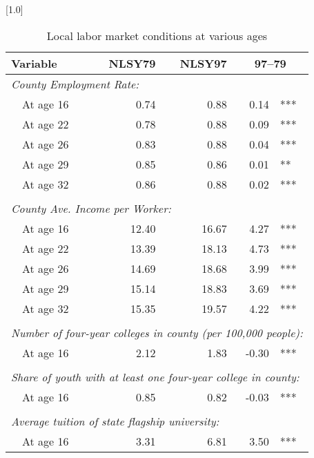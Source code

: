 \begin{table}[ht]
\caption{Local labor market conditions at various ages}
\label{tab:locallabmktbyage}
\centering
\scalebox{1.0}[1.0]{%
\begin{threeparttable}
\begin{tabular}{lrrr@{}l}
\toprule 
Variable \phantom{extraspacehere} & NLSY79 & NLSY97 & \multicolumn{2}{c}{97--79} \\
\midrule 
\multicolumn{5}{l}{\emph{County Employment Rate:}} \\
~~At age 16                      & 0.74 & 0.88 & 0.14 & *** \\ 
~~At age 22                      & 0.78 & 0.88 & 0.09 & *** \\ 
~~At age 26                      & 0.83 & 0.88 & 0.04 & *** \\ 
~~At age 29                      & 0.85 & 0.86 & 0.01 & ** \\ 
~~At age 32                      & 0.86 & 0.88 & 0.02 & *** \\ 
\vspace{-6pt}  \\
\multicolumn{5}{l}{\emph{County Ave. Income per Worker:}} \\
~~At age 16                      & 12.40 & 16.67 & 4.27 & *** \\ 
~~At age 22                      & 13.39 & 18.13 & 4.73 & *** \\ 
~~At age 26                      & 14.69 & 18.68 & 3.99 & *** \\ 
~~At age 29                      & 15.14 & 18.83 & 3.69 & *** \\ 
~~At age 32                      & 15.35 & 19.57 & 4.22 & *** \\ 
\vspace{-6pt}  \\
\multicolumn{5}{l}{\emph{Number of four-year colleges in county (per 100,000 people):}} \\
~~At age 16                      & 2.12 & 1.83 & -0.30 & *** \\ 
\vspace{-6pt}  \\
\multicolumn{5}{l}{\emph{Share of youth with at least one four-year college in county:}} \\
~~At age 16                      & 0.85 & 0.82 & -0.03 & *** \\ 
\vspace{-6pt}  \\
\multicolumn{5}{l}{\emph{Average tuition of state flagship university:}} \\~~At age 16                      & 3.31 & 6.81 & 3.50 & *** \\ 

\end{tabular}
\end{threeparttable}}
\end{table}
